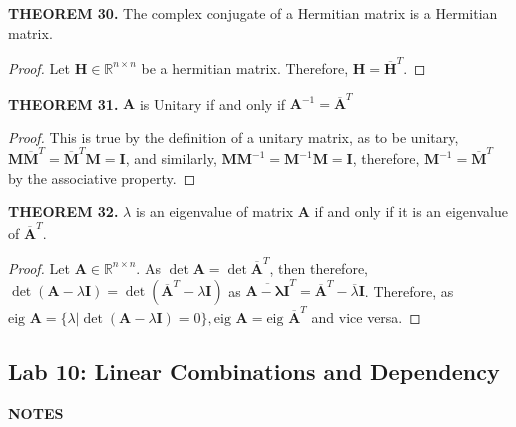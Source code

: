 \documentclass[12pt]{article}
\newcommand{\mat}[1]{\mathbf{#1}}
\newcommand{\theorem}[2]{\textbf{THEOREM #1.} #2}
\newcommand{\notes}{\textbf{NOTES}}
\newcommand{\eig}{\text{eig }}
\newcommand{\ct}[1]{\mat{\overline{#1}}^{T}}
\begin{document}
\theorem{30}{The complex conjugate of a Hermitian matrix is a Hermitian matrix.}

\begin{proof}
Let $\mat{H} \in \mathbb{R}^{n \times n}$ be a hermitian matrix. Therefore, $\mat{H} = \ct{H}$.
\end{proof}

\theorem{31}{$\mat{A}$ is Unitary if and only if $\mat{A}^{-1} = \ct{A}$}

\begin{proof}
This is true by the definition of a unitary matrix, as to be unitary, $\mat{M} \ct{M} = \ct{M} \mat{M} = \mat{I}$, and similarly, $\mat{M} \mat{M}^{-1} = \mat{M}^{-1} \mat{M} = \mat{I}$, therefore, $\mat{M}^{-1} = \ct{M}$ by the associative property.
\end{proof}

\theorem{32}{$\lambda$ is an eigenvalue of matrix $\mat{A}$ if and only if it is an eigenvalue of $\ct{A}$.}

\begin{proof}
Let $\mat{A} \in \mathbb{R}^{n \times n}$. As $\det \mat{A} = \det \ct{A}$, then therefore, $\det(\mat{A} - \lambda \mat{I}) = \det(\ct{A} - \lambda \mat{I})$ as $\ct{\mat{A} - \lambda \mat{I}} = \ct{A} - \overline{\lambda} \mat{I}$. Therefore, as $\eig \mat{A} = \{ \lambda | \det(\mat{A} - \lambda \mat{I}) = 0 \}, \eig \mat{A} = \eig \ct{A}$ and vice versa.
\end{proof}

\subsection{Lab 10: Linear Combinations and Dependency}

\notes
\end{document}
